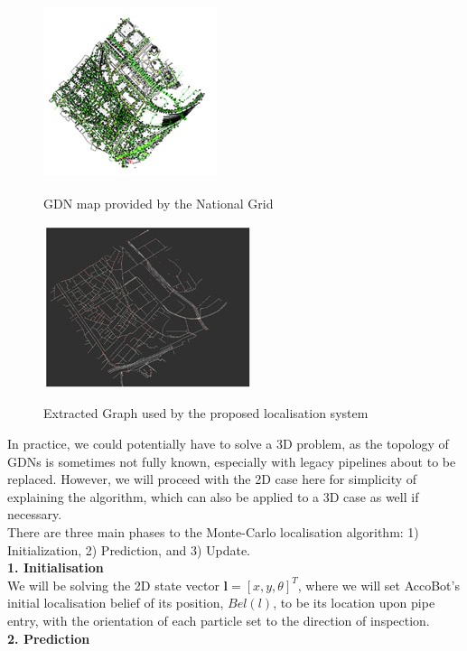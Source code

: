 \documentclass[11pt]{article}		%
\newlength{\imageheight}	 %
\newcommand{\supercite}[1]{\textsuperscript{\cite{#1}}}		%
\begin{document}
			\begin{figure}[h]
					\centering
					\begin{multicols}{2}
						\includegraphics[height=\imageheight]{map1.jpg}
						\caption{GDN map provided by the National Grid\supercite{sönnichsen_5_2021}}
						\label{gdnMap}
						\columnbreak
						\includegraphics[height=\imageheight]{map2.jpg}
						\caption{Extracted Graph used by the proposed localisation system}
						\label{localisationMap}
					\end{multicols}
				\end{figure}
		\vspace{-0.5cm}
	    In practice, we could potentially have to solve a 3D problem, as the topology of GDNs is sometimes not fully known, especially with legacy pipelines about to be replaced. However, we will proceed with the 2D case here for simplicity of explaining the algorithm, which can also be applied to a 3D case as well if necessary. 
	    \\ \hspace*{3ex}There are three main phases to the Monte-Carlo localisation algorithm: 1) Initialization, 2) Prediction, and 3) Update.
	    \\\textbf{1. Initialisation}
	    \\We will be solving the 2D state vector $\boldsymbol{l}=[x,  y,\theta]^{T}$, where we will set AccoBot's initial localisation belief of its position, $Bel(l)$, to be its location upon pipe entry, with the orientation of each particle set to the direction of inspection. 
	    \\\textbf{2. Prediction}
\end{document}
